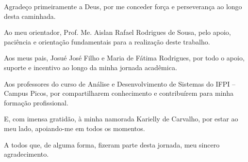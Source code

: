 \begin{agradecimentos}
  Agradeço primeiramente a Deus, por me conceder força e perseverança ao longo desta caminhada.
  
  Ao meu orientador, Prof. Me. Aislan Rafael Rodrigues de Sousa, pelo apoio, paciência e orientação fundamentais para a realização deste trabalho.
  
  Aos meus pais, Josué José Filho e Maria de Fátima Rodrigues, por todo o apoio, suporte e incentivo ao longo da minha jornada acadêmica.
  
  Aos professores do curso de Análise e Desenvolvimento de Sistemas do IFPI – Campus Picos, por compartilharem conhecimento e contribuírem para minha formação profissional.
  
  E, com imensa gratidão, à minha namorada Karielly de Carvalho, por estar ao meu lado, apoiando-me em todos os momentos.
  
  A todos que, de alguma forma, fizeram parte desta jornada, meu sincero agradecimento.
  \end{agradecimentos}